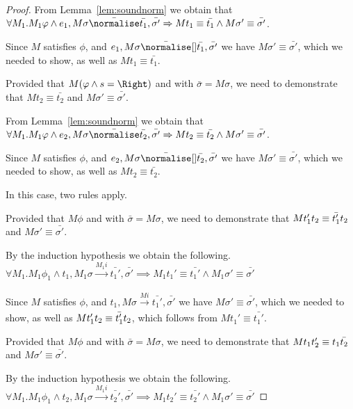 \begin{proof}
{{    From Lemma~\ref{lem:soundnorm} we obtain that $\forall M_1. M_1 \phi \land e_1,M\sigma\bar{\normalise}\bar{t_1},\bar{\sigma'}\implies M t_1\equiv\bar{t_1}\land M \sigma'\equiv\bar{\sigma'}$.

    Since $M$ satisfies $\phi$, and $e_1,M\sigma \bar{\normalise}[] \bar{t_1},\bar{\sigma'}$ we have $M\sigma'\equiv\bar{\sigma'}$,
    which we needed to show, as well as $M t_1 \equiv \bar{t_1}$.

    }
    {Provided that $M(\phi\wedge s=\Right)$ and  with $\bar{\sigma}=M\sigma$,
    we need to demonstrate that $M t_2\equiv \bar{t_2}$ and $M\sigma'\equiv \bar{\sigma'}$.

    From Lemma~\ref{lem:soundnorm} we obtain that $\forall M_1. M_1 \phi \land e_2,M\sigma\bar{\normalise}\bar{t_2},\bar{\sigma'}\implies M t_2\equiv\bar{t_2}\land M \sigma'\equiv\bar{\sigma'}$.

    Since $M$ satisfies $\phi$, and $e_2,M\sigma \bar{\normalise}[] \bar{t_2},\bar{\sigma'}$ we have $M\sigma'\equiv\bar{\sigma'}$,
    which we needed to show, as well as $M t_2 \equiv \bar{t_2}$.
    }
  }

  {
  In this case, two rules apply.\\
    {Provided that $M\phi$ and  with $\bar{\sigma}=M\sigma$,
    we need to demonstrate that $M t_1'\relax t_2\equiv \bar{t_1'}\relax t_2$ and $M\sigma'\equiv \bar{\sigma'}$.

    By the induction hypothesis we obtain the following.\\
    $\forall M_1 . M_1 \phi_1 \land t_1,M_1\sigma \xrightarrow[]{M_1 i} \bar{t_1'},\bar{\sigma'}\implies M_1 t_1'\equiv\bar{t_1'}\land M_1\sigma' \equiv \bar{\sigma'}$

    Since $M$ satisfies $\phi$, and $t_1,M\sigma\xrightarrow[]{M i} \bar{t_1'},\bar{\sigma'}$ we have $M\sigma'\equiv\bar{\sigma'}$,
    which we needed to show, as well as $M t_1'\relax t_2\equiv \bar{t_1'}\relax t_2$, which follows from $M t_1' \equiv \bar{t_1'}$.

    }
    {Provided that $M\phi$ and  with $\bar{\sigma}=M\sigma$,
    we need to demonstrate that $M t_1\relax t_2'\equiv t_1\relax \bar{t_2}$ and $M\sigma'\equiv \bar{\sigma'}$.

    By the induction hypothesis we obtain the following.\\
    $\forall M_1 . M_1 \phi_1 \land t_2,M_1\sigma \xrightarrow[]{M_1 i} \bar{t_2'},\bar{\sigma'}\implies M_1 t_2'\equiv\bar{t_2'}\land M_1\sigma' \equiv \bar{\sigma'}$

}}
\end{proof}
